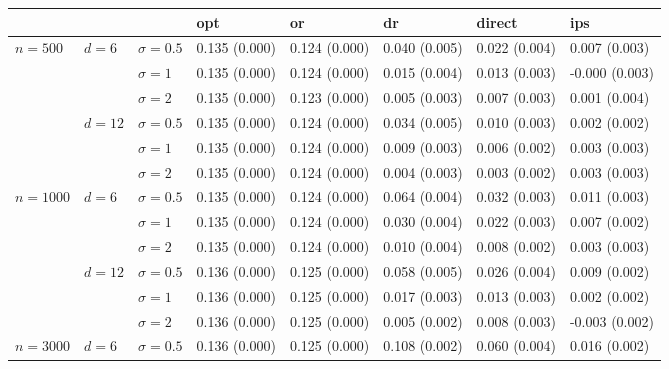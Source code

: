 \documentclass[11pt]{article} %
\theoremstyle{theorem}  %
\theoremstyle{plain}
\begin{document}
\begin{figure}[H]
\scriptsize
\centering
\begin{tabular}{llllllll}
\toprule
         &        &            &            opt &             or &             dr &         direct &             ips \\
\midrule
\multirow{6}{*}{$n=500$} & \multirow{3}{*}{$d=6$} & $\sigma=0.5$ &  0.135 (0.000) &  0.124 (0.000) &  0.040 (0.005) &  0.022 (0.004) &   0.007 (0.003) \\
         &        & $\sigma=1$ &  0.135 (0.000) &  0.124 (0.000) &  0.015 (0.004) &  0.013 (0.003) &  -0.000 (0.003) \\
         &        & $\sigma=2$ &  0.135 (0.000) &  0.123 (0.000) &  0.005 (0.003) &  0.007 (0.003) &   0.001 (0.004) \\
\cline{2-8}
         & \multirow{3}{*}{$d=12$} & $\sigma=0.5$ &  0.135 (0.000) &  0.124 (0.000) &  0.034 (0.005) &  0.010 (0.003) &   0.002 (0.002) \\
         &        & $\sigma=1$ &  0.135 (0.000) &  0.124 (0.000) &  0.009 (0.003) &  0.006 (0.002) &   0.003 (0.003) \\
         &        & $\sigma=2$ &  0.135 (0.000) &  0.124 (0.000) &  0.004 (0.003) &  0.003 (0.002) &   0.003 (0.003) \\
\cline{1-8}
\cline{2-8}
\multirow{6}{*}{$n=1000$} & \multirow{3}{*}{$d=6$} & $\sigma=0.5$ &  0.135 (0.000) &  0.124 (0.000) &  0.064 (0.004) &  0.032 (0.003) &   0.011 (0.003) \\
         &        & $\sigma=1$ &  0.135 (0.000) &  0.124 (0.000) &  0.030 (0.004) &  0.022 (0.003) &   0.007 (0.002) \\
         &        & $\sigma=2$ &  0.135 (0.000) &  0.124 (0.000) &  0.010 (0.004) &  0.008 (0.002) &   0.003 (0.003) \\
\cline{2-8}
         & \multirow{3}{*}{$d=12$} & $\sigma=0.5$ &  0.136 (0.000) &  0.125 (0.000) &  0.058 (0.005) &  0.026 (0.004) &   0.009 (0.002) \\
         &        & $\sigma=1$ &  0.136 (0.000) &  0.125 (0.000) &  0.017 (0.003) &  0.013 (0.003) &   0.002 (0.002) \\
         &        & $\sigma=2$ &  0.136 (0.000) &  0.125 (0.000) &  0.005 (0.002) &  0.008 (0.003) &  -0.003 (0.002) \\
\cline{1-8}
\cline{2-8}
\multirow{6}{*}{$n=3000$} & \multirow{3}{*}{$d=6$} & $\sigma=0.5$ &  0.136 (0.000) &  0.125 (0.000) &  0.108 (0.002) &  0.060 (0.004) &   0.016 (0.002) \\

\end{tabular}
\end{figure}
\end{document}
